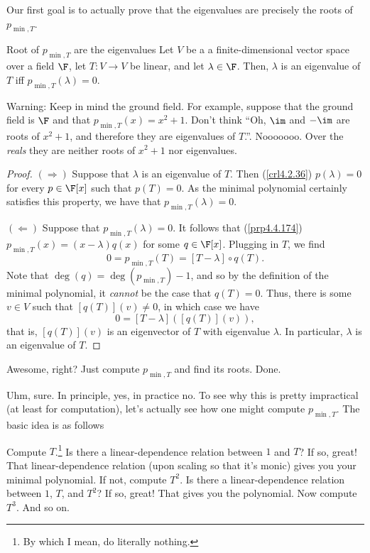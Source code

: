 Our first goal is to actually prove that the eigenvalues are precisely the roots of $p_{\min ,T}$.
\begin{thm}{Root of $p_{\min ,T}$ are the eigenvalues}{}
	Let $V$ be a a finite-dimensional vector space over a field $\F$, let $T\colon V\rightarrow V$ be linear, and let $\lambda \in \F$.  Then, $\lambda$ is an eigenvalue of $T$ iff $p_{\min ,T}(\lambda )=0$.
	\begin{rmk}
		Warning:  Keep in mind the ground field.  For example, suppose that the ground field is $\F$ and that $p_{\min ,T}(x)=x^2+1$.  Don't think ``Oh, $\im$ and $-\im$ are roots of $x^2+1$, and therefore they are eigenvalues of $T$.''.  Nooooooo.  Over the \emph{reals} they are neither roots of $x^2+1$ nor eigenvalues.
	\end{rmk}
	\begin{proof}
		$(\Rightarrow )$ Suppose that $\lambda$ is an eigenvalue of $T$.  Then (\cref{crl4.2.36}) $p(\lambda )=0$ for every $p\in \F [x]$ such that $p(T)=0$.  As the minimal polynomial certainly satisfies this property, we have that $p_{\min ,T}(\lambda )=0$.
		
		\blni
		$(\Leftarrow )$ Suppose that $p_{\min ,T}(\lambda )=0$.  It follows that (\cref{prp4.4.174}) $p_{\min ,T}(x)=(x-\lambda )q(x)$ for some $q\in \F [x]$.  Plugging in $T$, we find
		\begin{equation}
			0=p_{\min ,T}(T)=[T-\lambda ]\circ q(T).
		\end{equation}
		Note that $\deg (q)=\deg (p_{\min ,T})-1$, and so by the definition of the minimal polynomial, it \emph{cannot} be the case that $q(T)=0$.  Thus, there is some $v\in V$ such that $[q(T)](v)\neq 0$, in which case we have
		\begin{equation}
			0=[T-\lambda ]([q(T)](v)),
		\end{equation}
		that is, $[q(T)](v)$ is an eigenvector of $T$ with eigenvalue $\lambda$.  In particular, $\lambda$ is an eigenvalue of $T$.
	\end{proof}
\end{thm}

Awesome, right?  Just compute $p_{\min ,T}$ and find its roots.  Done.

Uhm, sure.  In principle, yes, in practice no.  To see why this is pretty impractical (at least for computation), let's actually see how one might compute $p_{\min ,T}$.  The basic idea is as follows

Compute $T$.\footnote{By which I mean, do literally nothing.}  Is there a linear-dependence relation between $1$ and $T$?  If so, great!  That linear-dependence relation (upon scaling so that it's monic) gives you your minimal polynomial.  If not, compute $T^2$.  Is there a linear-dependence relation between $1$, $T$, and $T^2$?  If so, great!  That gives you the polynomial.  Now compute $T^3$.  And so on.

